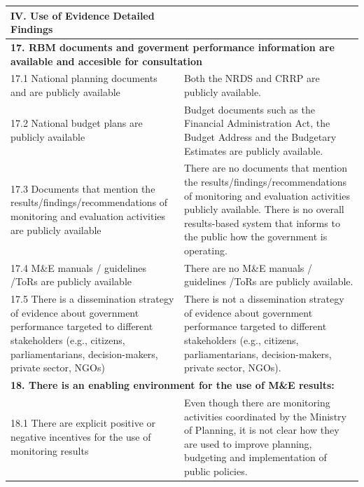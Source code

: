 \documentclass[
  10pt,
]{book}
\begin{document}
\begin{table}
\centering
\begin{tabular}[t]{l|l}
\hline
IV. Use of Evidence Detailed Findings &  \\
\hline
\multicolumn{2}{l}{\textbf{17. RBM documents and goverment performance information are available and accesible for consultation}}\\
\hline
\hspace{1em}17.1 National planning documents and are publicly available & Both the NRDS and CRRP are publicly available.\\
\hline
\hspace{1em}17.2 National budget plans are publicly available & Budget documents such as the Financial Administration Act, the Budget Address and the Budgetary Estimates are publicly available.\\
\hline
\hspace{1em}17.3 Documents that mention the results/findings/recommendations of monitoring and evaluation activities are publicly available & There are no documents that mention the results/findings/recommendations of monitoring and evaluation activities publicly available. There is no overall results-based system that informs to the public how the government is operating.\\
\hline
\hspace{1em}17.4 M\&E manuals / guidelines /ToRs are publicly available & There are no M\&E manuals / guidelines /ToRs are publicly available.\\
\hline
\hspace{1em}17.5 There is a dissemination strategy of evidence about government performance targeted to different stakeholders (e.g., citizens, parliamentarians, decision-makers, private sector, NGOs) & There is not a dissemination strategy of evidence about government performance targeted to different stakeholders (e.g., citizens, parliamentarians, decision-makers, private sector, NGOs).\\
\hline
\multicolumn{2}{l}{\textbf{18. There is an enabling environment for the use of M\&E results:}}\\
\hline
\hspace{1em}18.1 There are explicit positive or negative incentives for the use of monitoring results & Even though there are monitoring activities coordinated by the Ministry of Planning, it is not clear how they are used to improve planning, budgeting and implementation of public policies.\\
\hline

\end{tabular}
\end{table}
\end{document}
